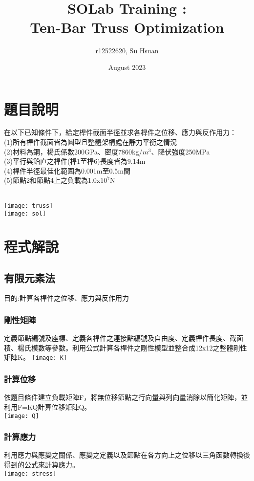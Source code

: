 \documentclass[12pt]{article}
\title{SOLab Training : \\Ten-Bar Truss Optimization}
\author{r12522620, Su Hsuan }
\date{August 2023}
\begin{document}
\begin{CJK}{UTF8}{bsmi}

\maketitle



\section{題目說明}
在以下已知條件下，給定桿件截面半徑並求各桿件之位移、應力與反作用力：\\
(1)所有桿件截面皆為圓型且整體架構處在靜力平衡之情況\\
(2)材料為鋼，楊氏係數200GPa、密度7860kg/$m^{3}$、降伏強度250MPa\\
(3)平行與鉛直之桿件(桿1至桿6)長度皆為9.14m\\
(4)桿件半徑最佳化範圍為0.001m至0.5m間\\
(5)節點2和節點4上之負載為1.0x$10^7$N\\
\\
\begin{center}
\texttt{[image: truss]}\\
\texttt{[image: sol]}
\end{center}


\section{程式解說}
    \subsection{有限元素法}
        目的:計算各桿件之位移、應力與反作用力
        \subsubsection{剛性矩陣}
            定義節點編號及座標、定義各桿件之連接點編號及自由度、定義桿件長度、截面積、楊氏模數等參數。利用公式計算各桿件之剛性模型並整合成12x12之整體剛性矩陣K。
            \texttt{[image: K]}
        \subsubsection{計算位移}
            依題目條件建立負載矩陣F，將無位移節點之行向量與列向量消除以簡化矩陣，並利用F=KQ計算位移矩陣Q。\\
            \texttt{[image: Q]}
		 \subsubsection{計算應力}
            利用應力與應變之關係、應變之定義以及節點在各方向上之位移以三角函數轉換後得到的公式來計算應力。\\\texttt{[image: stress]}

\end{CJK}
\end{document}
